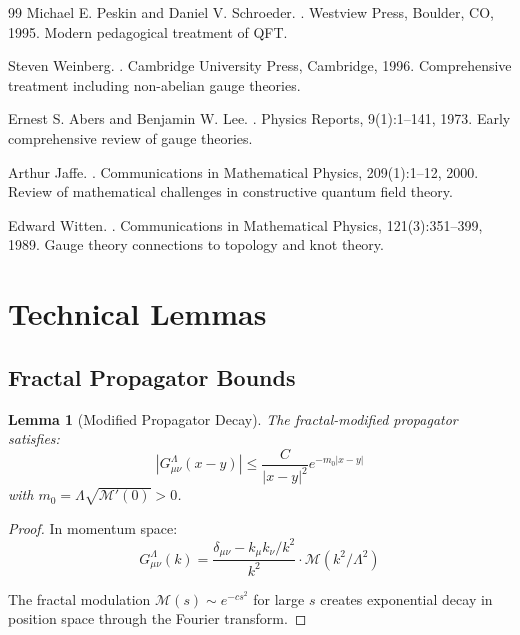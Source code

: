 \documentclass[12pt]{article}
\newtheorem{lemma}[theorem]{Lemma}
\begin{document}
\begin{thebibliography}{99}
Michael E. Peskin and Daniel V. Schroeder.
.
\newblock Westview Press, Boulder, CO, 1995.
\newblock Modern pedagogical treatment of QFT.

Steven Weinberg.
.
\newblock Cambridge University Press, Cambridge, 1996.
\newblock Comprehensive treatment including non-abelian gauge theories.

Ernest S. Abers and Benjamin W. Lee.
.
\newblock Physics Reports, 9(1):1--141, 1973.
\newblock Early comprehensive review of gauge theories.

Arthur Jaffe.
.
\newblock Communications in Mathematical Physics, 209(1):1--12, 2000.
\newblock Review of mathematical challenges in constructive quantum field theory.

Edward Witten.
.
\newblock Communications in Mathematical Physics, 121(3):351--399, 1989.
\newblock Gauge theory connections to topology and knot theory.

\end{thebibliography}
\pagebreak

\appendix

\section{Technical Lemmas}

\subsection{Fractal Propagator Bounds}

\begin{lemma}[Modified Propagator Decay]
The fractal-modified propagator satisfies:
\begin{equation}
|G_{\mu\nu}^\Lambda(x-y)| \leq \frac{C}{|x-y|^2} e^{-m_0|x-y|}
\end{equation}
with $m_0 = \Lambda \sqrt{\mathcal{M}'(0)} > 0$.
\end{lemma}

\begin{proof}
In momentum space:
\begin{equation}
G_{\mu\nu}^\Lambda(k) = \frac{\delta_{\mu\nu} - k_\mu k_\nu/k^2}{k^2} \cdot \mathcal{M}(k^2/\Lambda^2)
\end{equation}

The fractal modulation $\mathcal{M}(s) \sim e^{-cs^2}$ for large $s$ creates exponential decay in position space through the Fourier transform.
\end{proof}
\end{document}
